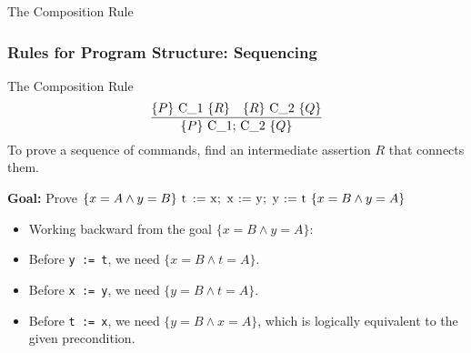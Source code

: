 \documentclass[aspectratio=169]{beamer}
\newcommand{\code}[1]{\lstinline|#1|}
\newcommand{\hoare}[3]{\ensuremath{\{#1\}\ \code{#2}\ \{#3\}}}
\begin{document}
\begin{frame}{The Composition Rule}
 \frametitle{Rules for Program Structure: Sequencing}
    \begin{alertblock}{The Composition Rule}
        \[ \frac{\hoare{P}{C_1}{R} \quad \hoare{R}{C_2}{Q}}{\hoare{P}{C_1; C_2}{Q}} \]
        To prove a sequence of commands, find an intermediate assertion $R$ that connects them.
    \end{alertblock}
    \begin{example}
     \textbf{Goal:} Prove \hoare{x=A \land y=B}{t := x; x := y; y := t}{x=B \land y=A}
     \begin{itemize}
         \item Working backward from the goal $\{x=B \land y=A\}$:
         \item Before \code{y := t}, we need $\{x=B \land t=A\}$.
         \item Before \code{x := y}, we need $\{y=B \land t=A\}$.
         \item Before \code{t := x}, we need $\{y=B \land x=A\}$, which is logically equivalent to the given precondition.
     \end{itemize}
    \end{example}
\end{frame}
\end{document}
